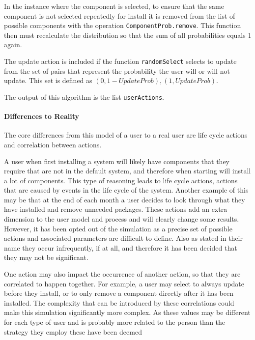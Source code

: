 In the instance where the component is selected, to ensure that the same component is not selected repeatedly for install it is removed from the list of possible components
with the operation \verb+ComponentProb.remove+.
This function then must recalculate the distribution so that the sum of all probabilities equals 1 again.

The update action is included if the function \verb+randomSelect+ selects to update from the set of pairs that represent the probability the user will or will not update.
This set is defined as ${(0,1-UpdateProb),(1,UpdateProb)}$.

The output of this algorithm is the list \verb+userActions+.

\paragraph{Differences to Reality}
The core differences from this model of a user to a real user are life cycle actions and correlation between actions.

A user when first installing a system will likely have components that they require that are not in the default system, and therefore when starting will install a lot of components.
This type of reasoning leads to life cycle actions, actions that are caused by events in the life cycle of the system.
Another example of this may be that at the end of each month a user decides to look through what they have installed and remove unneeded packages.
These actions add an extra dimension to the user model and process and will clearly change some results.
However, it has been opted out of the simulation as a precise set of possible actions and associated parameters are difficult to define.
Also as stated in their name they occur infrequently, if at all, and therefore it has been decided that they may not be significant.  

One action may also impact the occurrence of another action, so that they are correlated to happen together.
For example, a user may select to always update before they install, or to only remove a component directly after it has been installed.
The complexity that can be introduced by these correlations could make this simulation significantly more complex.
As these values may be different for each type of user and is probably more related to the person than the strategy they employ these have been deemed 

